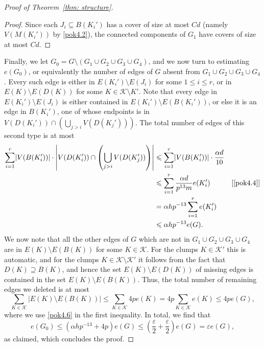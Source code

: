 \documentclass[10pt]{article}
\theoremstyle{definition}
\newcommand\ab[1]{\lvert#1\rvert}
\newcommand\bab[1]{\left\lvert#1\right\rvert}
\let\leq\leqslant
\begin{document}
\begin{proof}[Proof of Theorem~\ref{thm: structure}]
\begin{proof}
Since each $J_i\subseteq B(K_i')$  has a cover of size at most $ Cd$ (namely $V(M(K_i'))$ by \cref{pok4.2}), the connected components of $G_1$ have covers of size at most $Cd$.  
\end{proof}
Finally, we let $G_0 = G \setminus (G_1\cup G_2 \cup G_3 \cup G_4)$, and we now turn to estimating $e(G_0)$, or equivalently the number of edges of $G$ absent from $G_1\cup G_2\cup G_3\cup G_4$. Every such edge is either in $E(K_i')\setminus E(J_i)$ for some $1 \leq i \leq r$, or in $E(K) \setminus E(D(K))$ for some $K \in \mathcal K \setminus K'$. Note that every edge in $E(K_i') \setminus E(J_i)$ is either contained in $E(K_i') \setminus E(B(K_i'))$, or else it is an edge in $B(K_i')$, one of whose endpoints is in $V(D(K_i'))\cap (\bigcup_{j>i}V(D(K_j')))$. The total number of edges of this second type is at most
\begin{align*}
    \sum_{i=1}^r \ab{V(B(K_i'))}\cdot \bab{V(D(K_i'))\cap \left(\bigcup_{j>i}V(D(K_j'))\right)} & \leq \sum_{i=1}^r \ab{V(B(K_i'))}\cdot \frac{\alpha d}{10}\\
    &\leq \sum_{i=1}^r \frac{\alpha d} {p^{13}m} e(K_i') &[\text{\cref{pok4.4}}]\\
    &=\alpha hp^{-13} \sum_{i=1}^r e(K_i')\\
    &\leq \alpha hp^{-13}e(G).
\end{align*}
We now note that all the other edges of $G$ which are not in $G_1 \cup G_2 \cup G_3 \cup G_4$ are in $E(K) \setminus E(B(K))$ for some $K \in \mathcal K$. For the clumps $K \in \mathcal K'$ this is automatic, and for the clumps $K \in \mathcal K\setminus \mathcal K'$ it follows from the fact that $D(K)\supseteq B(K)$, and hence the set $E(K) \setminus E(D(K))$ of missing edges is contained in the set $E(K) \setminus E(B(K))$. Thus, the total number of remaining edges we deleted is at most
\[
\sum_{K \in \mathcal K}\ab{E(K)\setminus E(B(K))} \leq \sum_{K \in \mathcal K}4p e(K) = 4p\sum_{K \in \mathcal K} e(K) \leq 4pe(G),
\]
where we use \cref{pok4.6} in the first inequality. In total, we find that
\[
e(G_0)\leq (\alpha h p^{-13}+4p)e(G) \leq \left(\frac \varepsilon 2 +\frac \varepsilon 2\right) e(G)= \varepsilon e(G),
\]
as claimed, which concludes the proof.
\end{proof}
\end{document}
